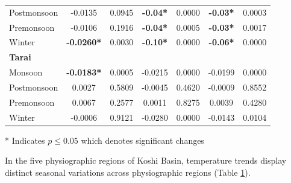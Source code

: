 \begin{table}[htbp]
\begin{tabular}{@{}lcccccc@{}}
      Postmonsoon & -0.0135 & 0.0945 & \textbf{-0.04*} & 0.0000 & \textbf{-0.03*} & 0.0003 \\ 
      Premonsoon & -0.0106 & 0.1916 & \textbf{-0.04*} & 0.0005 & \textbf{-0.03*} & 0.0017 \\ 
      Winter & \textbf{-0.0260*} & 0.0030 & \textbf{-0.10*} & 0.0000 & \textbf{-0.06*} & 0.0000 \\ 
      \midrule
      \textbf{Tarai} & & & & & & \\ 
      Monsoon & \textbf{-0.0183*} & 0.0005 & -0.0215 & 0.0000 & -0.0199 & 0.0000 \\ 
      Postmonsoon & 0.0027 & 0.5809 & -0.0045 & 0.4620 & -0.0009 & 0.8552 \\ 
      Premonsoon & 0.0067 & 0.2577 & 0.0011 & 0.8275 & 0.0039 & 0.4280 \\ 
      Winter & -0.0006 & 0.9121 & -0.0280 & 0.0000 & -0.0143 & 0.0104 \\ 
      \bottomrule
  \end{tabular}
  \label{tab:spatial_trends}
  \begin{flushleft}
    \footnotesize{* Indicates \( p \leq 0.05 \) which denotes significant changes} \\
    
\end{flushleft}
\end{table}




In the five physiographic regions of Koshi Basin, temperature trends display distinct seasonal variations across physiographic regions (Table \ref{tab:spatial_trends}).


